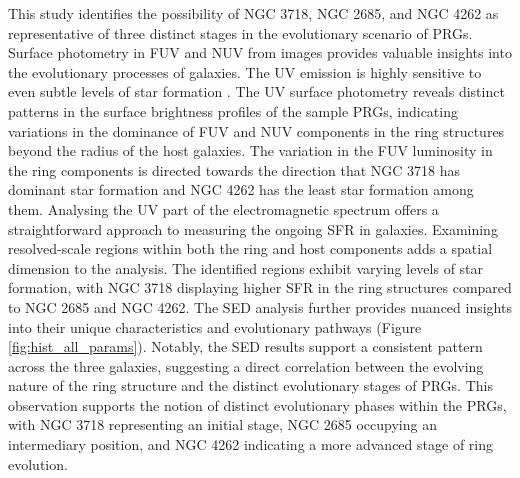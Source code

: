 \documentclass{pas}
\begin{document}
This study identifies the possibility of NGC 3718, NGC 2685, and NGC 4262 as representative of three distinct stages in the evolutionary scenario of PRGs. Surface photometry in FUV and NUV from images provides valuable insights into the evolutionary processes of galaxies. The UV emission is highly sensitive to even subtle levels of star formation \citep{2011munoz_mateos,2017Rampazzo,2018Bouquin}. The UV surface photometry reveals distinct patterns in the surface brightness profiles of the sample PRGs, indicating variations in the dominance of FUV and NUV components in the ring structures beyond the radius of the host galaxies. The variation in the FUV luminosity in the ring components is directed towards the direction that NGC 3718 has dominant star formation and NGC 4262 has the least star formation among them. Analysing the UV part of the electromagnetic spectrum offers a straightforward approach to measuring the ongoing SFR in galaxies. {Examining resolved-scale regions within both the ring and host components adds a spatial dimension to the analysis. The identified regions exhibit varying levels of star formation, with NGC 3718 displaying higher SFR in the ring structures compared to NGC 2685 and NGC 4262.  The SED analysis further provides nuanced insights into their unique characteristics and evolutionary pathways (Figure \ref{fig:hist_all_params}).} Notably, the SED results support a consistent pattern across the three galaxies, suggesting a direct correlation between the evolving nature of the ring structure and the distinct evolutionary stages of PRGs. This observation supports the notion of distinct evolutionary phases within the PRGs, with NGC 3718 representing an initial stage, NGC 2685 occupying an intermediary position, and NGC 4262 indicating a more advanced stage of ring evolution.\par
\end{document}
